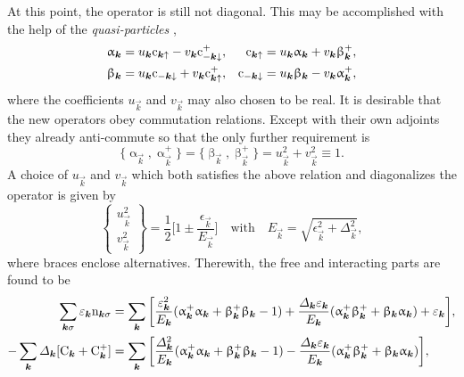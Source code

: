 At this point, the  operator is still not diagonal. This may be
accomplished with the help of the \emph{ quasi-particles}
\cite[42]{Bogoliubov57},
%
\begin{align*}
    \upalpha_{\boldsymbol k} &=
        u_{\boldsymbol k} \mathrm c_{\boldsymbol k \uparrow} - v_{\boldsymbol k} \mathrm c_{-\boldsymbol k \downarrow}^+, &
    \mathrm c_{\boldsymbol k \uparrow} &=
        u_{\boldsymbol k} \upalpha_{\boldsymbol k} + v_{\boldsymbol k} \upbeta_{\boldsymbol k}^+, \\
    \upbeta_{\boldsymbol k} &=
        u_{\boldsymbol k} \mathrm c_{-\boldsymbol k \downarrow} + v_{\boldsymbol k} \mathrm c_{\boldsymbol k \uparrow}^+, &
    \mathrm c_{-\boldsymbol k \downarrow} &=
        u_{\boldsymbol k} \upbeta_{\boldsymbol k} - v_{\boldsymbol k} \upalpha_{\boldsymbol k}^+,
\end{align*}
%
where the coefficients $u_{\vec k}$ and $v_{\vec k}$ may also chosen to be real.
It is desirable that the new operators obey  commutation relations.
Except with their own adjoints they already anti-commute so that the only
further requirement is
%
\begin{equation*}
    \{ \upalpha_{\vec k}, \upalpha_{\vec k}^+ \}
    = \{ \upbeta_{\vec k}, \upbeta_{\vec k}^+ \}
    = u_{\vec k}^2 + v_{\vec k}^2 \equiv 1.
\end{equation*}
%
A choice of $u_{\vec k}$ and $v_{\vec k}$ which both satisfies the above
relation and diagonalizes the  operator is given by
\cite[Eq.~7]{Bogoliubov57}
%
\begin{equation*}
    \begin{Bmatrix} u_{\vec k}^2 \\ v_{\vec k}^2 \end{Bmatrix} = \frac 1 2
    \bigg[ 1 \pm \frac{\epsilon_{\vec k}}{E_{\vec k}} \bigg]
    \quad \text{with} \quad
    E_{\vec k} = \sqrt{\epsilon_{\vec k}^2 + \Delta_{\vec k}^2},
\end{equation*}
%
where braces enclose alternatives. Therewith, the free and interacting parts are
found to be
%
\begin{align*}
    \sum_{\boldsymbol k \sigma} \varepsilon_{\boldsymbol k} \mathrm n_{\boldsymbol k \sigma}
    &= \sum_{\boldsymbol k} \bigg[
        \frac{\varepsilon_{\boldsymbol k}^2}{E_{\boldsymbol k}}
            ( \upalpha_{\boldsymbol k}^+ \upalpha_{\boldsymbol k}
            + \upbeta_{\boldsymbol k}^+ \upbeta_{\boldsymbol k} - 1)
        + \frac{\varDelta_{\boldsymbol k} \varepsilon_{\boldsymbol k}}{E_{\boldsymbol k}}
            ( \upalpha_{\boldsymbol k}^+ \upbeta_{\boldsymbol k}^+
            + \upbeta_{\boldsymbol k} \upalpha_{\boldsymbol k} )
        + \varepsilon_{\boldsymbol k}
    \bigg],
    \\
    -\sum_{\boldsymbol k} \varDelta_{\boldsymbol k} [\mathrm C_{\boldsymbol k} + \mathrm C_{\boldsymbol k}^+]
    &= \sum_{\boldsymbol k} \bigg[
        \frac{\varDelta_{\boldsymbol k}^2}{E_{\boldsymbol k}}
            ( \upalpha_{\boldsymbol k}^+ \upalpha_{\boldsymbol k}
            + \upbeta_{\boldsymbol k}^+ \upbeta_{\boldsymbol k} - 1)
        - \frac{\varDelta_{\boldsymbol k} \varepsilon_{\boldsymbol k}}{E_{\boldsymbol k}}
            ( \upalpha_{\boldsymbol k}^+ \upbeta_{\boldsymbol k}^+
            + \upbeta_{\boldsymbol k} \upalpha_{\boldsymbol k} )
    \bigg],
\end{align*}
